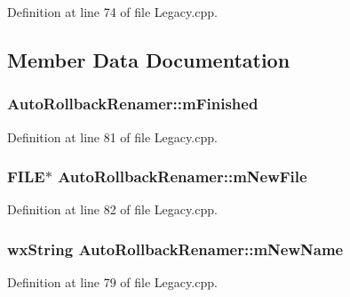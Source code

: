 Definition at line 74 of file Legacy.\+cpp.



\subsection{Member Data Documentation}
\subsubsection[{\texorpdfstring{m\+Finished}{mFinished}}]{ Auto\+Rollback\+Renamer\+::m\+Finished}\hypertarget{class_auto_rollback_renamer_aaf57119c698b2ed46df50eaf42e36310}{}\label{class_auto_rollback_renamer_aaf57119c698b2ed46df50eaf42e36310}


Definition at line 81 of file Legacy.\+cpp.

\subsubsection[{\texorpdfstring{m\+New\+File}{mNewFile}}]{\setlength{\rightskip}{0pt plus 5cm}F\+I\+LE$\ast$ Auto\+Rollback\+Renamer\+::m\+New\+File}\hypertarget{class_auto_rollback_renamer_a44b45b1af2942a4bf6e97a15aa55e55c}{}\label{class_auto_rollback_renamer_a44b45b1af2942a4bf6e97a15aa55e55c}


Definition at line 82 of file Legacy.\+cpp.

\subsubsection[{\texorpdfstring{m\+New\+Name}{mNewName}}]{\setlength{\rightskip}{0pt plus 5cm}wx\+String Auto\+Rollback\+Renamer\+::m\+New\+Name}\hypertarget{class_auto_rollback_renamer_a195879821551f3faa08be065b4b18195}{}\label{class_auto_rollback_renamer_a195879821551f3faa08be065b4b18195}


Definition at line 79 of file Legacy.\+cpp.

